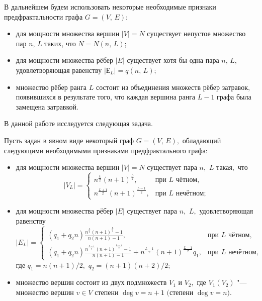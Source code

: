 В дальнейшем будем использовать некоторые необходимые признаки предфрактальности графа $G=(V,\,E)$:
\begin{itemize}
\item[a)] для мощности множества вершин $| V |=N$ существует непустое множество пар $n$, $L$ таких, что $N=N(n,\,L)$;

\item[b)] для мощности множества рёбер $| E |$ существует хотя бы одна пара $n$, $L$, удовлетворяющая равенству $|Е_L|=q(n,\,L)$;

\item[c)] множество рёбер ранга $L$ состоит из объединения множеств рёбер затравок, появившихся в результате того, что каждая вершина
ранга $L-1$ графа была замещена затравкой.


\end{itemize}

В данной работе исследуется следующая задача.

\smallskip

\begin{task}Пусть задан в явном виде некоторый граф $G=(V,\,E),$ обладающий следующими необходимыми признаками предфрактального графа$:$
\begin{itemize}

\item[$a)$] для мощности множества вершин $| V |=N$ существует пара $n,$ $L$ такая$,$ что
$$
| V_L|=\begin{cases}
n^{\frac{L}{2}}(n+1)^{\frac{L}{2}}, & \text{при $L$ чётном}, \\
n^{\frac{L+1}{2}}(n+1)^{\frac{L-1}{2}},& \text{при $L$ нечётном};
\end{cases}
$$

\item[$b)$] для мощности множества рёбер $| E |$ существует пара $n,$ $L,$ удовлетворяющая равенству
$$
|E_L| = \begin{cases}
\left( q_1 + q_2 n \right) \frac{n^{\frac{L}{2}}(n+1)^{\frac{L}{2}}-1}{n(n+1)-1}, & \text{при $L$ чётном}, \\
\left( q_1 + q_2 n \right)
\frac{n^{\frac{L-1}{2}}(n+1)^{\frac{L-1}{2}}-1}{n(n+1)-1}+n^{\frac{L-1}{2}}(n+1)^{\frac{L-1}{2}}q_1,&\text{при $L$ нечётном},
\end{cases}
$$
где $q_1 =n(n+1)/{2},$ $q_2 = (n+1)(n+2)/{2};$

\item[$c)$] множество вершин состоит из двух подмножеств $V_1$ и $V_2,$ где $V_1 (V_2)$ "--- множество вершин $v\in V$ степени $\deg v=n+1$ $($степени $\deg v=n).$
\end{itemize}
\end{task}


